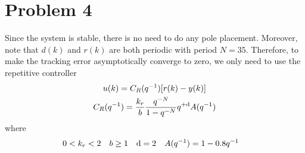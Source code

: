 \section*{Problem 4}

Since the system is stable, there is no need to do any pole placement. Moreover, note that $d(k)$ and $r(k)$ are both periodic with period $N = 35$. Therefore, to make the tracking error asymptotically converge to zero, we only need to use the repetitive controller
\begin{gather*}
    u(k) = C_R(q^{-1}) [r(k) - y(k)] \\
    C_R(q^{-1}) = \frac{k_r}{b} \frac{q^{-N}}{1-q^{-N}} q^{+\textrm{d}} A(q^{-1})
\end{gather*} 
where
\begin{align*}
    0 & < k_r < 2
        & b & \geq 1
        & \textrm{d} & = 2
        & A(q^{-1}) & = 1 - 0.8q^{-1}
\end{align*}